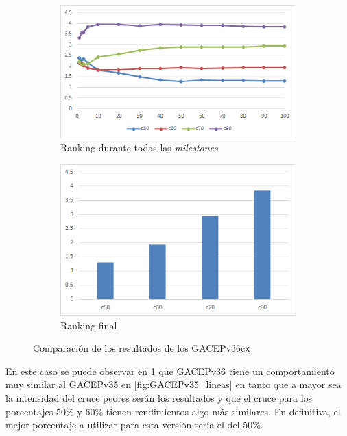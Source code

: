 \begin{figure}[h]
     \centering
     \begin{subfigure}[b]{0.45\textwidth}
         \centering
         \includegraphics[width=\textwidth]{imagenes/Experimental/GACEPv36.png}
         \caption{Ranking durante todas las \textit{milestones}}
         \label{fig:GACEPv36_lineas}
     \end{subfigure}
     \hfill
     \begin{subfigure}[b]{0.45\textwidth}
         \centering
         \includegraphics[width=\textwidth]{imagenes/Experimental/barras/GACEPv36.png}
         \caption{Ranking final}
         \label{fig:GACEPv36_barras}
     \end{subfigure}
        \caption{Comparación de los resultados de los GACEPv36c\texttt{x}}
        \label{fig:GACEPv36}
\end{figure}

En este caso se puede observar en \ref{fig:GACEPv36_lineas} que GACEPv36 tiene un comportamiento muy similar al GACEPv35 en \ref{fig:GACEPv35_lineas} en tanto que a mayor sea la intensidad del cruce peores serán los resultados y que el cruce para los porcentajes 50\% y 60\% tienen rendimientos algo más similares. 
En definitiva, el mejor porcentaje a utilizar para esta versión sería el del 50\%.

